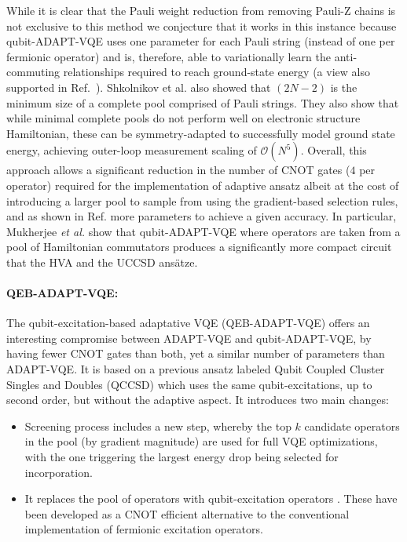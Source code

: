 While it is clear that the Pauli weight reduction from removing Pauli-Z chains is not exclusive to this method we conjecture that it works in this instance because qubit-ADAPT-VQE uses one parameter for each Pauli string (instead of one per fermionic operator) and is, therefore, able to variationally learn the anti-commuting relationships required to reach ground-state energy (a view also supported in Ref.~\cite{Yordanov2021}).
Shkolnikov et al. \cite{Shkolnikov2021} also showed that $(2N - 2)$ is the minimum size of a complete pool comprised of Pauli strings. They also show that while minimal complete pools do not perform well on electronic structure Hamiltonian, these can be symmetry-adapted to successfully model ground state energy, achieving outer-loop measurement scaling of $\mathcal{O}(N^5)$.
Overall, this approach allows a significant reduction in the number of CNOT gates ($4$ per operator) required for the implementation of adaptive ansatz albeit at the cost of introducing a larger pool to sample from using the gradient-based selection rules, and as shown in Ref. \cite{Tang2021} more parameters to achieve a given accuracy. In particular, Mukherjee \textit{et al.} \cite{Mukherjee2022} show that qubit-ADAPT-VQE where operators are taken from a pool of Hamiltonian commutators produces a significantly more compact circuit that the HVA and the UCCSD ans{\"{a}}tze.

\paragraph{QEB-ADAPT-VQE:}

The qubit-excitation-based adaptative VQE \cite{Yordanov2021} (QEB-ADAPT-VQE) offers an interesting compromise between ADAPT-VQE and qubit-ADAPT-VQE, by having fewer CNOT gates than both, yet a similar number of parameters than ADAPT-VQE. It is based on a previous ansatz labeled Qubit Coupled Cluster Singles and Doubles (QCCSD) \cite{Xia2020} which uses the same qubit-excitations, up to second order, but without the adaptive aspect. It introduces two main changes:
\begin{itemize}
    \item Screening process includes a new step, whereby the top $k$ candidate operators in the pool (by gradient magnitude) are used for full VQE optimizations, with the one triggering the largest energy drop being selected for incorporation. \item It replaces the pool of operators with qubit-excitation operators \cite{Yordanov2020_QE}. These have been developed as a CNOT efficient alternative to the conventional implementation of fermionic excitation operators.
\end{itemize}

